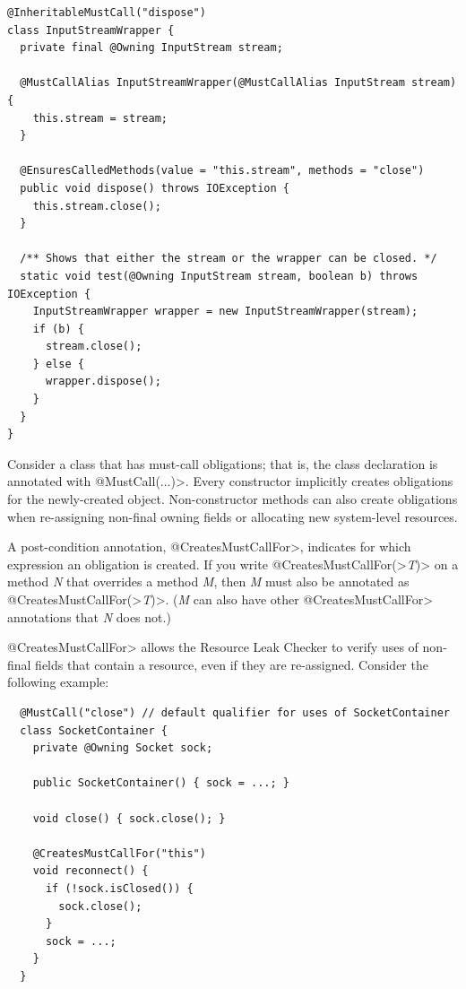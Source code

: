 \begin{verbatim}
@InheritableMustCall("dispose")
class InputStreamWrapper {
  private final @Owning InputStream stream;

  @MustCallAlias InputStreamWrapper(@MustCallAlias InputStream stream) {
    this.stream = stream;
  }

  @EnsuresCalledMethods(value = "this.stream", methods = "close")
  public void dispose() throws IOException {
    this.stream.close();
  }

  /** Shows that either the stream or the wrapper can be closed. */
  static void test(@Owning InputStream stream, boolean b) throws IOException {
    InputStreamWrapper wrapper = new InputStreamWrapper(stream);
    if (b) {
      stream.close();
    } else {
      wrapper.dispose();
    }
  }
}
\end{verbatim}



Consider a class that has must-call obligations; that is, the class
declaration is annotated with \<@MustCall(...)>.
Every constructor implicitly creates obligations for the newly-created object.
Non-constructor methods can also create obligations
when re-assigning non-final owning fields or allocating
new system-level resources.

A post-condition annotation,
\<@CreatesMustCallFor>,
indicates for which expression an obligation is created.
If you write \<@CreatesMustCallFor(>\emph{T}\<)> on a method \emph{N} that
overrides a method \emph{M}, then \emph{M} must also be annotated as
\<@CreatesMustCallFor(>\emph{T}\<)>.  (\emph{M} can also have other
\<@CreatesMustCallFor> annotations that \emph{N} does not.)

\<@CreatesMustCallFor> allows the Resource Leak Checker to verify uses of non-final fields
that contain a resource, even if they are re-assigned. Consider
the following example:

\begin{verbatim}
  @MustCall("close") // default qualifier for uses of SocketContainer
  class SocketContainer {
    private @Owning Socket sock;

    public SocketContainer() { sock = ...; }

    void close() { sock.close(); }

    @CreatesMustCallFor("this")
    void reconnect() {
      if (!sock.isClosed()) {
        sock.close();
      }
      sock = ...;
    }
  }
\end{verbatim}

